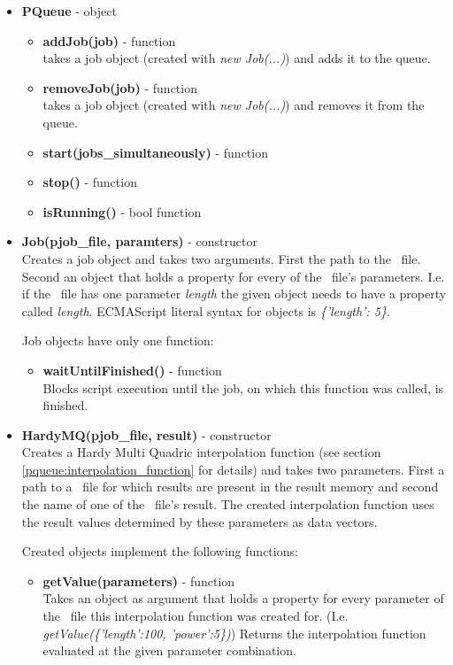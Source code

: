 \begin{itemize}
	\item \textbf{PQueue} - object
	\begin{itemize}
		\item \textbf{addJob(job)} - function\\
		takes a job object (created with \textit{new Job(...)}) and adds it to the queue.
		\item \textbf{removeJob(job)} - function\\
		takes a job object (created with \textit{new Job(...)}) and removes it from the queue.
		\item \textbf{start(jobs\_simultaneously)} - function
		\item \textbf{stop()} - function 
		\item \textbf{isRunning()} - bool function
	\end{itemize}
	
	\item \textbf{Job(pjob\_file, paramters)} - constructor\\
	Creates a job object and takes two arguments. First the path to the \PJOB\ file.
	Second an object that holds a property for every of the \PJOB\ file's parameters.
	I.e. if the \PJOB\ file has one parameter \textit{length}
	the given object needs to have a property called \textit{length}.
	ECMAScript literal syntax for objects is \textit{ \{'length': 5\}}.
	
	Job objects have only one function:
	\begin{itemize}
		\item \textbf{waitUntilFinished()} - function\\
		Blocks script execution until the job, on which this function was called, is finished.
	\end{itemize}
	
	\item \textbf{HardyMQ(pjob\_file, result)} - constructor\\
	Creates a Hardy Multi Quadric interpolation function (see section \ref{pqueue:interpolation_function} for details)
	and takes two parameters.
	First a path to a \PJOB\ file for which results are present in the result memory
	and second the name of one of the \PJOB\ file's result.
	The created interpolation function uses the result values determined by these parameters as data vectors.
	
	Created objects implement the following functions:
	\begin{itemize}
		\item \textbf{getValue(parameters)} - function\\
		Takes an object as argument that holds a property for every parameter of the \PJOB\ file
		this interpolation function was created for.
		(I.e. \textit{getValue(\{'length':100, 'power':5\})})
		Returns the interpolation function evaluated at the given parameter combination.
		

\end{itemize}
\end{itemize}
